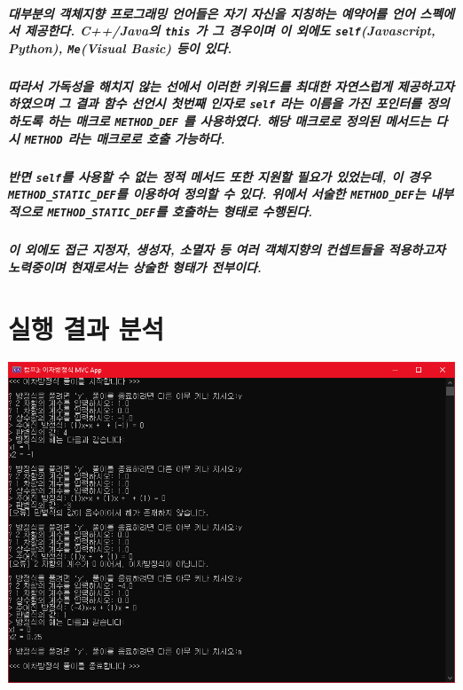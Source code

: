 \documentclass[UTF8]{report}
\begin{document}
            \paragraph{%
                \normalfont 대부분의 객체지향 프로그래밍 언어들은 자기 자신을 지칭하는 예약어를 언어 스펙에서 제공한다. C++/Java의 \texttt{this} 가 그 경우이며 이 외에도 \texttt{self}(Javascript, Python), \texttt{Me}(Visual Basic) 등이 있다.
            }
        
            \paragraph{%
                \normalfont 따라서 가독성을 해치지 않는 선에서 이러한 키워드를 최대한 자연스럽게 제공하고자 하였으며 그 결과 함수 선언시 첫번째 인자로 \texttt{self} 라는 이름을 가진 포인터를 정의하도록 하는 매크로 \texttt{METHOD\_DEF} 를 사용하였다. 해당 매크로로 정의된 메서드는 다시 \texttt{METHOD} 라는 매크로로 호출 가능하다.
            }

            \paragraph{%
                \normalfont 반면 \texttt{self}를 사용할 수 없는 정적 메서드 또한 지원할 필요가 있었는데, 이 경우 \texttt{METHOD\_STATIC\_DEF}를 이용하여 정의할 수 있다. 위에서 서술한 \texttt{METHOD\_DEF}는 내부적으로 \texttt{METHOD\_STATIC\_DEF}를 호출하는 형태로 수행된다.
            }

            \paragraph{%
                \normalfont 이 외에도 접근 지정자, 생성자, 소멸자 등 여러 객체지향의 컨셉트들을 적용하고자 노력중이며 현재로서는 상술한 형태가 전부이다.
            }

    \chapter{실행 결과 분석}
        \includegraphics[width=\textwidth]{test_result.png}
\end{document}
